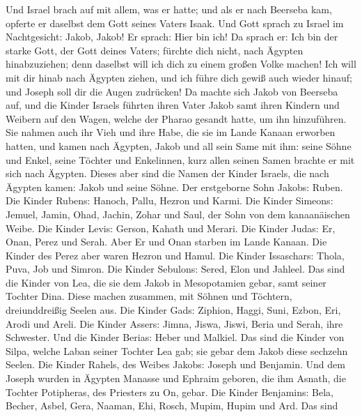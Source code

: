  Und Israel brach auf mit allem, was er hatte; und als er
nach Beerseba kam, opferte er daselbst dem Gott seines Vaters Isaak.
 Und Gott sprach zu Israel im Nachtgesicht: Jakob, Jakob!
Er sprach: Hier bin ich!  Da sprach er: Ich bin der starke
Gott, der Gott deines Vaters; fürchte dich nicht, nach Ägypten
hinabzuziehen; denn daselbst will ich dich zu einem großen Volke machen!
 Ich will mit dir hinab nach Ägypten ziehen, und ich führe
dich gewiß auch wieder hinauf; und Joseph soll dir die Augen zudrücken!
 Da machte sich Jakob von Beerseba auf, und die Kinder
Israels führten ihren Vater Jakob samt ihren Kindern und Weibern auf den
Wagen, welche der Pharao gesandt hatte, um ihn hinzuführen.
 Sie nahmen auch ihr Vieh und ihre Habe, die sie im Lande
Kanaan erworben hatten, und kamen nach Ägypten, Jakob und all sein Same
mit ihm:  seine Söhne und Enkel, seine Töchter und
Enkelinnen, kurz allen seinen Samen brachte er mit sich nach Ägypten.
 Dieses aber sind die Namen der Kinder Israels, die nach
Ägypten kamen: Jakob und seine Söhne. Der erstgeborne Sohn Jakobs:
Ruben.  Die Kinder Rubens: Hanoch, Pallu, Hezron und
Karmi.  Die Kinder Simeons: Jemuel, Jamin, Ohad, Jachin,
Zohar und Saul, der Sohn von dem kanaanäischen Weibe. 
Die Kinder Levis: Gerson, Kahath und Merari.  Die Kinder
Judas: Er, Onan, Perez und Serah. Aber Er und Onan starben im Lande
Kanaan. Die Kinder des Perez aber waren Hezron und Hamul.
 Die Kinder Issaschars: Thola, Puva, Job und Simron.
 Die Kinder Sebulons: Sered, Elon und Jahleel.
 Das sind die Kinder von Lea, die sie dem Jakob in
Mesopotamien gebar, samt seiner Tochter Dina. Diese machen zusammen, mit
Söhnen und Töchtern, dreiunddreißig Seelen aus.  Die
Kinder Gads: Ziphion, Haggi, Suni, Ezbon, Eri, Arodi und Areli.
 Die Kinder Assers: Jimna, Jiswa, Jiswi, Beria und Serah,
ihre Schwester. Und die Kinder Berias: Heber und Malkiel.
 Das sind die Kinder von Silpa, welche Laban seiner
Tochter Lea gab; sie gebar dem Jakob diese sechzehn Seelen.
 Die Kinder Rahels, des Weibes Jakobs: Joseph und
Benjamin.  Und dem Joseph wurden in Ägypten Manasse und
Ephraim geboren, die ihm Asnath, die Tochter Potipheras, des Priesters
zu On, gebar.  Die Kinder Benjamins: Bela, Becher, Asbel,
Gera, Naaman, Ehi, Rosch, Mupim, Hupim und Ard.  Das sind
